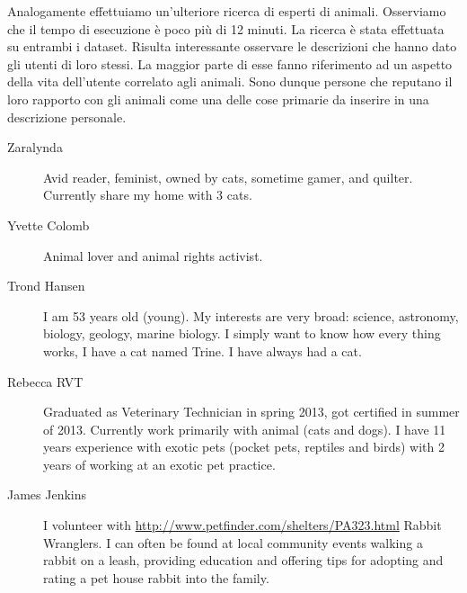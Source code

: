 Analogamente effettuiamo un'ulteriore ricerca di esperti di animali. Osserviamo che il tempo di esecuzione è poco più di 12 minuti. La ricerca è stata effettuata su entrambi i dataset. Risulta interessante osservare le descrizioni che hanno dato gli utenti di loro stessi. La maggior parte di esse fanno riferimento ad un aspetto della vita dell'utente correlato agli animali. Sono dunque persone che reputano il loro rapporto con gli animali come una delle cose primarie da inserire in una descrizione personale.

\begin{description}
\item[Zaralynda]Avid reader, feminist, owned by cats, sometime gamer, and quilter.
Currently share my home with 3 cats.
\item[Yvette Colomb]Animal lover and animal rights activist.
\item[Trond Hansen]I am 53 years old (young). My interests are very broad: science, astronomy, biology, geology, marine biology. I simply want to know how every thing works, I have a cat named Trine. I have always had a cat.
\item[Rebecca RVT]Graduated as Veterinary Technician in spring 2013, got certified in summer of 2013. Currently work primarily with  animal (cats and dogs). I have 11 years experience with exotic pets (pocket pets, reptiles and birds) with 2 years of working at an exotic pet practice.
\item[James Jenkins]I volunteer with \url{http://www.petfinder.com/shelters/PA323.html} Rabbit Wranglers. I can often be found at local community events walking a rabbit on a leash, providing education and offering tips for adopting and rating a pet house rabbit into the family.

\end{description}

